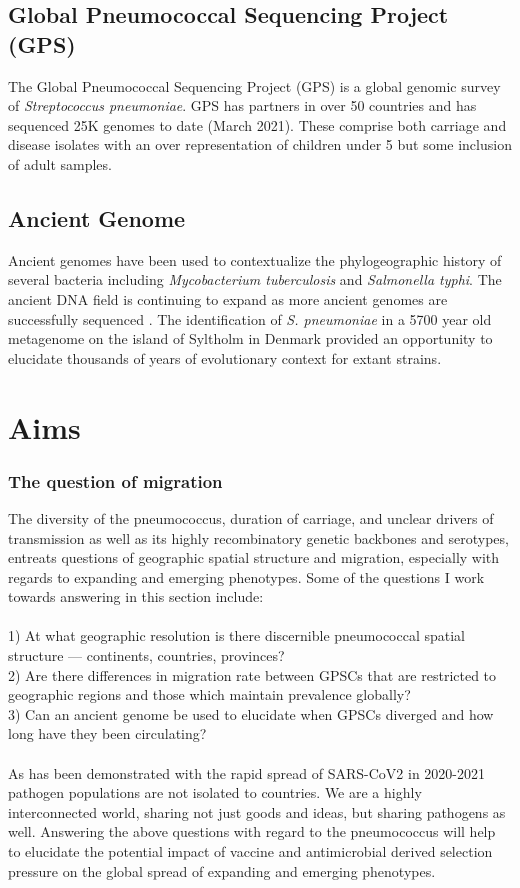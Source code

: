 \documentclass{article}
\begin{document}
\subsection{Global Pneumococcal Sequencing Project (GPS)}
The Global Pneumococcal Sequencing Project (GPS) is a global genomic survey of \textit{Streptococcus pneumoniae}. GPS has partners in over 50 countries and has sequenced 25K  genomes to date (March 2021). These comprise both carriage and disease isolates with an over representation of children under 5 but some inclusion of adult samples.
\subsection{Ancient Genome }
Ancient genomes have been used to contextualize the phylogeographic history of several bacteria including \textit{Mycobacterium tuberculosis} and \textit{Salmonella typhi}\cite{bosPreColumbianMycobacterialGenomes2014,vageneSalmonellaEntericaGenomes2018}. The ancient DNA field is continuing to expand as more ancient genomes are successfully sequenced \cite{neukamm2000yearoldPathogenGenomes2020}. The identification of \textit{S. pneumoniae} in a 5700 year old metagenome on the island of Syltholm in Denmark provided an opportunity to elucidate thousands of years of evolutionary context for extant strains\cite{jensen5700YearoldHuman2019}. 
\section{Aims}
\subsubsection{The question of migration} 
The diversity of the pneumococcus, duration of carriage, and unclear drivers of transmission as well as its highly recombinatory genetic backbones and serotypes, entreats questions of geographic spatial structure and migration, especially with regards to expanding and emerging phenotypes. Some of the questions I work towards answering in this section include:
\\
\\1) At what geographic resolution is there discernible pneumococcal spatial structure --- continents, countries, provinces? 
\\2) Are there differences in migration rate between GPSCs that are restricted to geographic regions and those which maintain prevalence globally?  
\\3) Can an ancient genome be used to elucidate when GPSCs diverged and how long have they been circulating? 
\\
\\As has been demonstrated with the rapid spread of SARS-CoV2 in 2020-2021 pathogen populations are not isolated to countries. We are a highly interconnected world, sharing not just goods and ideas, but sharing pathogens as well. Answering the above questions with regard to the pneumococcus will help to elucidate the potential impact of vaccine and antimicrobial derived selection pressure on the global spread of expanding and emerging phenotypes. 
\end{document}
